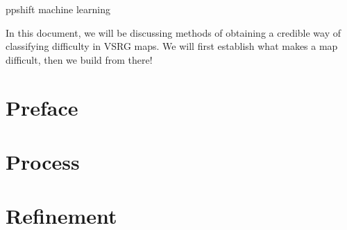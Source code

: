 \documentclass{article}
\begin{document}
	ppshift machine learning
	
	In this document, we will be discussing methods of obtaining a credible way of classifying difficulty in VSRG maps. We will first establish what makes a map difficult, then we build from there!
	
\newpage
\part{Preface}


\newpage


\newpage
\part{Process}
		

\newpage

\newpage

\newpage

\newpage


\part{Refinement}

\end{document}
